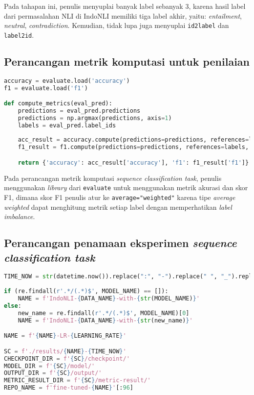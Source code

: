 Pada tahapan ini, penulis menyuplai banyak label sebanyak 3, karena hasil label dari permasalahan NLI di IndoNLI memiliki tiga label akhir, yaitu: \emph{entailment}, \emph{neutral}, \emph{contradiction}. Kemudian, tidak lupa juga menyuplai \texttt{id2label} dan \texttt{label2id}.

\subsection{Perancangan metrik komputasi untuk penilaian}
\begin{lstlisting}[language=Python, caption=Perancangan metrik komputasi untuk penilaian \emph{sequence classification task}]
accuracy = evaluate.load('accuracy')
f1 = evaluate.load('f1')

def compute_metrics(eval_pred):
    predictions = eval_pred.predictions
    predictions = np.argmax(predictions, axis=1)
    labels = eval_pred.label_ids
    
    acc_result = accuracy.compute(predictions=predictions, references=labels)
    f1_result = f1.compute(predictions=predictions, references=labels, average="weighted")

    return {'accuracy': acc_result['accuracy'], 'f1': f1_result['f1']}
\end{lstlisting}

Pada perancangan metrik komputasi \emph{sequence classification task}, penulis menggunakan \emph{library} dari \texttt{evaluate} untuk menggunakan metrik akurasi dan skor F1, dimana skor F1 penulis atur ke \texttt{average="weighted"} karena tipe \emph{average weighted} dapat menghitung metrik setiap label dengan memperhatikan \emph{label imbalance}.

\subsection{Perancangan penamaan eksperimen \emph{sequence classification task}}
\begin{lstlisting}[language=Python, caption=Perancangan penamaan eksperimen \emph{sequence classification task}]
TIME_NOW = str(datetime.now()).replace(":", "-").replace(" ", "_").replace(".", "_")
    
if (re.findall(r'.*/(.*)$', MODEL_NAME) == []): 
    NAME = f'IndoNLI-{DATA_NAME}-with-{str(MODEL_NAME)}'
else:
    new_name = re.findall(r'.*/(.*)$', MODEL_NAME)[0]
    NAME = f'IndoNLI-{DATA_NAME}-with-{str(new_name)}'

NAME = f'{NAME}-LR-{LEARNING_RATE}'

SC = f'./results/{NAME}-{TIME_NOW}'
CHECKPOINT_DIR = f'{SC}/checkpoint/'
MODEL_DIR = f'{SC}/model/'
OUTPUT_DIR = f'{SC}/output/'
METRIC_RESULT_DIR = f'{SC}/metric-result/'
REPO_NAME = f'fine-tuned-{NAME}'[:96]
\end{lstlisting}

